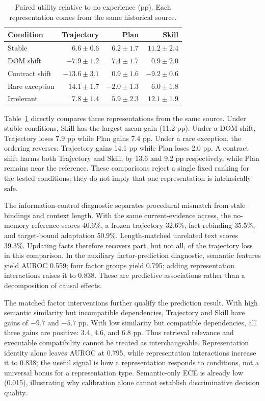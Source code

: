 \documentclass[sigconf,anonymous,review]{acmart}
\theoremstyle{zhplain}
\begin{document}
\begin{table}[t]
\centering
\caption{Paired utility relative to no experience (pp). Each representation comes from the same historical source.}
\label{tab:rq1}
\small
\begin{tabular}{@{}lrrr@{}}
\toprule
Condition & Trajectory & Plan & Skill \\
\midrule
Stable & \(6.6\!\pm\!0.6\) & \(6.2\!\pm\!1.7\) & \(11.2\!\pm\!2.4\) \\
DOM shift & \(-7.9\!\pm\!1.2\) & \(7.4\!\pm\!1.7\) & \(0.9\!\pm\!2.0\) \\
Contract shift & \(-13.6\!\pm\!3.1\) & \(0.9\!\pm\!1.6\) & \(-9.2\!\pm\!0.6\) \\
Rare exception & \(14.1\!\pm\!1.7\) & \(-2.0\!\pm\!1.3\) & \(6.0\!\pm\!1.8\) \\
Irrelevant & \(7.8\!\pm\!1.4\) & \(5.9\!\pm\!2.3\) & \(12.1\!\pm\!1.9\) \\
\bottomrule
\end{tabular}
\end{table}


Table~\ref{tab:rq1} directly compares three representations from the same source. Under stable conditions, Skill has the largest mean gain (11.2 pp). Under a DOM shift, Trajectory loses 7.9 pp while Plan gains 7.4 pp. Under a rare exception, the ordering reverses: Trajectory gains 14.1 pp while Plan loses 2.0 pp. A contract shift harms both Trajectory and Skill, by 13.6 and 9.2 pp respectively, while Plan remains near the reference. These comparisons reject a single fixed ranking for the tested conditions; they do not imply that one representation is intrinsically safe.

The information-control diagnostic separates procedural mismatch from stale bindings and context length. With the same current-evidence access, the no-memory reference scores 40.6\%, a frozen trajectory 32.6\%, fact rebinding 35.5\%, and target-bound adaptation 50.9\%. Length-matched unrelated text scores 39.3\%. Updating facts therefore recovers part, but not all, of the trajectory loss in this comparison. In the auxiliary factor-prediction diagnostic, semantic features yield AUROC 0.559; four factor groups yield 0.795; adding representation interactions raises it to 0.838. These are predictive associations rather than a decomposition of causal effects.

The matched factor interventions further qualify the prediction result. With high semantic similarity but incompatible dependencies, Trajectory and Skill have gains of \(-9.7\) and \(-5.7\) pp. With low similarity but compatible dependencies, all three gains are positive: 3.4, 4.6, and 6.8 pp. Thus retrieval relevance and executable compatibility cannot be treated as interchangeable. Representation identity alone leaves AUROC at 0.795, while representation interactions increase it to 0.838; the useful signal is how a representation responds to conditions, not a universal bonus for a representation type. Semantic-only ECE is already low (0.015), illustrating why calibration alone cannot establish discriminative decision quality.
\end{document}
